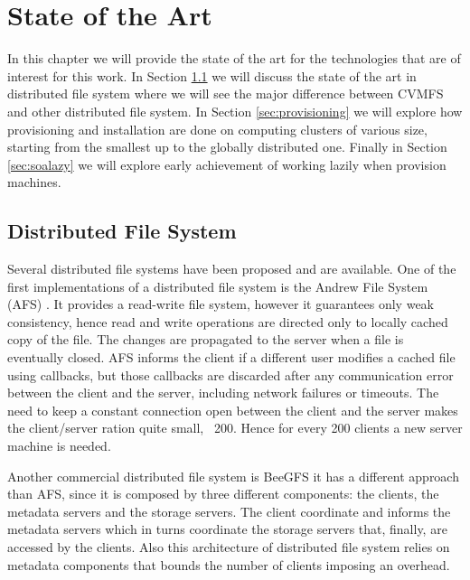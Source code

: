 \chapter{State of the Art}\label{ch:SoA}

In this chapter we will provide the state of the art for the technologies that are
of interest for this work. In Section \ref{sec:distribute} we will discuss the
state of the art in distributed file system where we will see the major
difference between CVMFS and other distributed file system. In Section
\ref{sec:provisioning} we will explore how provisioning and installation are
done on computing clusters of various size, starting from the smallest up to
the globally distributed one. Finally in Section \ref{sec:soalazy} we will
explore early achievement of working lazily when provision machines.

\section{Distributed File System} \label{sec:distribute}

Several distributed file systems have been proposed and are available. One of
the first implementations of a distributed file system is the Andrew File System
(AFS) \cite{andrew}. It provides a read-write file system, however it guarantees
only weak consistency, hence read and write operations are directed only to
locally cached copy of the file. The changes are propagated to the server when
a file is eventually closed. AFS informs the client if a different user modifies a
cached file using callbacks, but those callbacks are discarded after any
communication error between the client and the server, including network
failures or timeouts. The need to keep a constant connection open between the
client and the server makes the client/server ration quite small, ~200. Hence
for every 200 clients a new server machine is needed.

Another commercial distributed file system is BeeGFS \cite{beegfs} it has a
different approach than AFS, since it is composed by three different
components: the clients, the metadata servers and the storage servers. The
client coordinate and informs the metadata servers which in turns coordinate
the storage servers that, finally, are accessed by the clients.  Also this
architecture of distributed file system relies on metadata components that
bounds the number of clients imposing an overhead.

